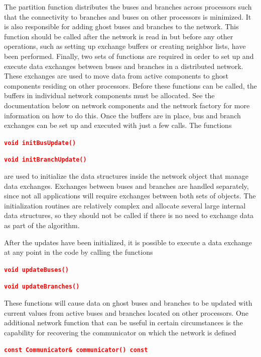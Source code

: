 \documentclass[12pt]{report} %
\begin{document}
The partition function distributes the buses and branches across processors such that the connectivity to branches and buses on other processors is minimized. It is also responsible for adding ghost buses and branches to the network. This function should be called after the network is read in but before any other operations, such as setting up exchange buffers or creating neighbor lists, have been performed.
Finally, two sets of functions are required in order to set up and execute data exchanges between buses and branches in a distributed network. These exchanges are used to move data from active components to ghost components residing on other processors. Before these functions can be called, the buffers in individual network components must be allocated. See the documentation below on network components and the network factory for more information on how to do this. Once the buffers are in place, bus and branch exchanges can be set up and executed with just a few calls. The functions

\textcolor{red}{\texttt{\textbf{void initBusUpdate()}}}
\textcolor{red}{\texttt{\textbf{}}}

\textcolor{red}{\texttt{\textbf{void initBranchUpdate()}}}

are used to initialize the data structures inside the network object that manage data exchanges. Exchanges between buses and branches are handled separately, since not all applications will require exchanges between both sets of objects. The initialization routines are relatively complex and allocate several large internal data structures, so they should not be called if there is no need to exchange data as part of the algorithm.

After the updates have been initialized, it is possible to execute a data exchange at any point in the code by calling the functions

\textcolor{red}{\texttt{\textbf{void updateBuses()}}}
\textcolor{red}{\texttt{\textbf{}}}

\textcolor{red}{\texttt{\textbf{void updateBranches()}}}

These functions will cause data on ghost buses and branches to be updated with current values from active buses and branches located on other processors.
One additional network function that can be useful in certain circumstances is the capability for recovering the communicator on which the network is defined

\textcolor{red}{\texttt{\textbf{const Communicator\& communicator() const}}}
\end{document}
